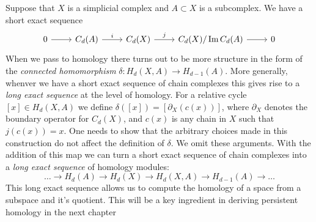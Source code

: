 Suppose that $X$ is a simplicial complex and $A \subset X$ is a subcomplex. We have a short exact sequence 
\[
\begin{tikzcd}
0 \arrow{r}& C_d(A) \arrow{r}{i} & C_d(X) \arrow{r}{j} & C_d(X)/\Im{C_d(A)} \arrow{r} & 0 
\end{tikzcd}
\]
When we pass to homology there turns out to be more structure in the form of the \emph{connected homomorphism}  $\delta: H_d(X,A) \rightarrow H_{d-1}(A)$. More generally, whenver we have a short exact sequence of chain complexes this gives rise to a \emph{long exact sequence} at the level of homology. 
 For a relative cycle $[x] \in H_d(X,A)$ we define $\delta([x]) = [\partial_X(c(x))]$, where $\partial_X$ denotes the boundary operator for $C_d(X)$, and $c(x)$ is any chain in $X$ such that $j(c(x)) = x$. One needs to show that the arbitrary choices made in this construction do not affect the definition of $\delta$. We omit these arguments. 
 With the addition of this map we can turn a short exact sequence of chain complexes into a \emph{long exact sequence} of homology modules:
\[ \ldots \rightarrow H_d(A) \rightarrow H_d(X) \rightarrow H_d(X,A) \rightarrow H_{d-1}(A) \rightarrow \ldots \]
This long exact sequence allows us to compute the homology of a space from a subspace and it's quotient. This will be a key ingredient in deriving persistent homology in the next chapter